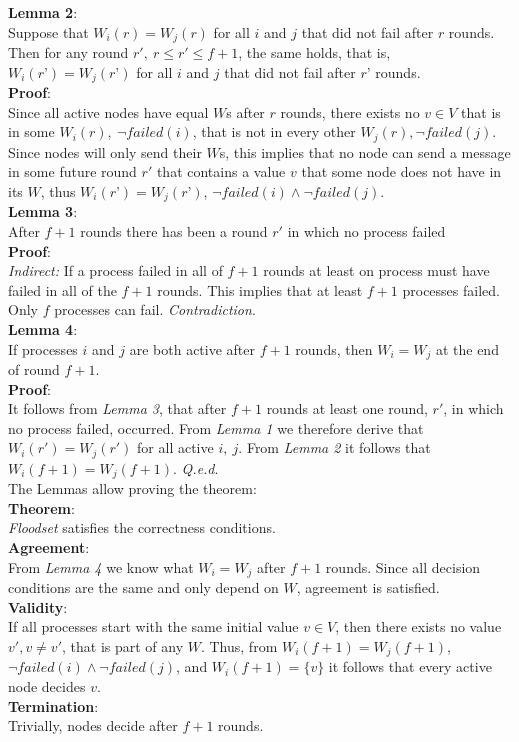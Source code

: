 \documentclass[fleqn]{article}
\begin{document}
\noindent \textbf{Lemma 2}:\\
Suppose that $W_i(r) = W_j(r)$ for all $i$ and $j$ that did not fail after $r$ rounds. Then for any round $r',\ r \le r' ≤ f + 1$, the same holds, that is, $W_i(r’) = W_j(r’)$ for all $i$ and $j$ that did not fail after $r’$ rounds.\\
\textbf{Proof}:\\
Since all active nodes have equal $W$s after $r$ rounds, there exists no $v \in V$ that is in some $W_i(r),\ \neg failed(i)$, that is not in every other $W_j(r), \neg failed(j)$.
Since nodes will only send their $W$s, this implies that no node can send a message in some future round $r'$ that contains a value $v$ that some node does not have in its $W$, thus $W_i(r’) = W_j(r’)$, $\neg failed(i) \land \neg failed(j)$.\\

\noindent \textbf{Lemma 3}:\\
After $f+1$ rounds there has been a round $r'$ in which no process failed\\
\textbf{Proof}:\\
\textit{Indirect:} If a process failed in all of $f+1$ rounds at least on process must have failed in all of the $f+1$ rounds. This implies
that at least $f+1$ processes failed. Only $f$ processes can fail. \textit{Contradiction}.\\


\noindent \textbf{Lemma 4}:\\
If processes $i$ and $j$ are both active after $f+1$ rounds, then $W_i = W_j$ at the end of round $f + 1$.\\
\textbf{Proof}:\\
It follows from \textit{Lemma 3}, that after $f+1$ rounds at least one round, $r'$, in which no process failed, occurred. From \textit{Lemma 1} we therefore derive that $W_i(r') = W_j(r')$ for all active $i,\ j$.
From \textit{Lemma 2} it follows that $W_i(f+1) = W_j(f+1)$. \textit{Q.e.d}.\\

\noindent The Lemmas allow proving the theorem:\\
\noindent \textbf{Theorem}:\\
\textit{Floodset} satisfies the correctness conditions.\\
\textbf{Agreement}:\\
From \textit{Lemma 4} we know what $W_i = W_j$ after $f+1$ rounds. Since all decision conditions are the same and only depend on $W$, agreement is satisfied.\\
\textbf{Validity}:\\
If all processes start with the same initial value $v \in V$, then there exists no value $v', v \neq v'$, that is part of any $W$. Thus, from $W_i(f+1) = W_j(f+1)$, $\neg failed(i) \land \neg failed(j)$, and $W_i(f+1) = \{v\}$ it follows
that every active node decides $v$.\\
\textbf{Termination}:\\
Trivially, nodes decide after $f+1$ rounds.\\
\end{document}
